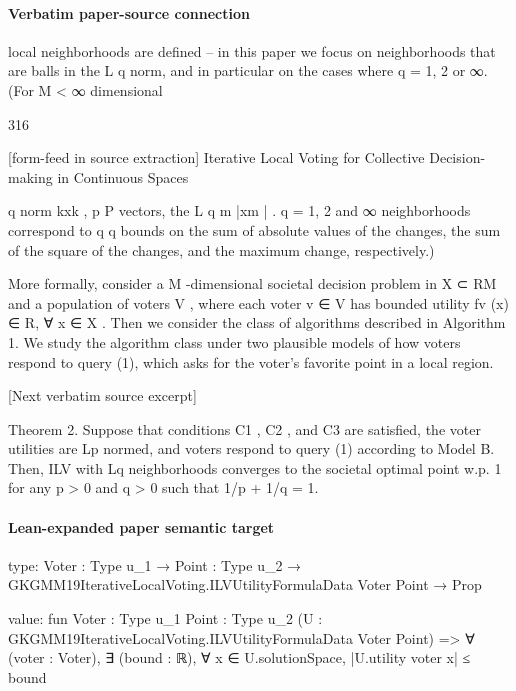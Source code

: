 \documentclass[10pt]{article}
\begin{document}
\paragraph{Verbatim paper-source connection}
\begin{ReviewVerbatim}
local neighborhoods are defined – in this paper we focus on neighborhoods that are balls in
the L
     q norm, and in particular on the cases where q = 1, 2 or ∞. (For M < ∞ dimensional



                                              316

[form-feed in source extraction]
   Iterative Local Voting for Collective Decision-making in Continuous Spaces

               q norm kxk ,
                                p P
vectors, the L                              q
                                     m |xm | .   q = 1, 2 and ∞ neighborhoods correspond to
                                q
                         q
bounds on the sum of absolute values of the changes, the sum of the square of the changes,
and the maximum change, respectively.)

   More formally, consider a M -dimensional societal decision problem in X  ⊂ RM and a
population of voters V , where each voter v ∈ V has bounded utility fv (x) ∈ R, ∀ x ∈ X .
Then we consider the class of algorithms described in Algorithm 1. We study the algorithm
class under two plausible models of how voters respond to query (1), which asks for the
voter's favorite point in a local region.



[Next verbatim source excerpt]

Theorem 2. Suppose that conditions C1 , C2 , and C3 are satisfied, the voter utilities are
Lp normed, and voters respond to query (1) according to Model B. Then, ILV with Lq
neighborhoods converges to the societal optimal point w.p. 1 for any p > 0 and q > 0 such
that 1/p + 1/q = 1.
\end{ReviewVerbatim}



\paragraph{Lean-expanded paper semantic target}
\begin{ReviewVerbatim}
type:
{Voter : Type u_1} → {Point : Type u_2} → GKGMM19IterativeLocalVoting.ILVUtilityFormulaData Voter Point → Prop

value:
fun {Voter : Type u_1} {Point : Type u_2} (U : GKGMM19IterativeLocalVoting.ILVUtilityFormulaData Voter Point) =>
  ∀ (voter : Voter), ∃ (bound : ℝ), ∀ x ∈ U.solutionSpace, |U.utility voter x| ≤ bound
\end{ReviewVerbatim}
\end{document}
